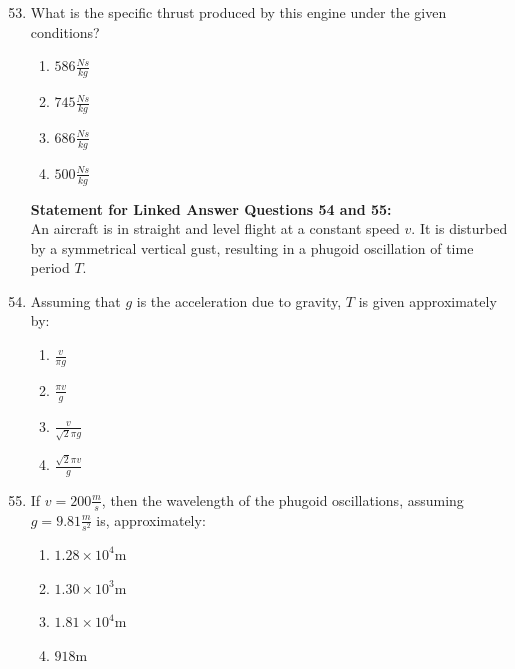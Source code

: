 \documentclass[journal]{IEEEtran}
\begin{document}
\begin{enumerate}
\setcounter{enumi}{52}
 
    \item What is the specific thrust produced by this engine under the given conditions?

        \begin{multicols}{4}
            \begin{enumerate}
                \item $586\frac{Ns}{kg}$
                \item $745\frac{Ns}{kg}$
                \item $686\frac{Ns}{kg}$
                \item $500\frac{Ns}{kg}$
            \end{enumerate}
        \end{multicols}

    \textbf{Statement for Linked Answer Questions 54 and 55:}\\
    An aircraft is in straight and level flight at a constant speed $v$. It is disturbed by a symmetrical vertical gust, resulting in a phugoid oscillation of time period $T$.\\

    \item Assuming that $g$ is the acceleration due to gravity, $T$ is given approximately by:

        \begin{multicols}{4}
            \begin{enumerate}
                \item $\frac{v}{\pi g}$
                \item $\frac{\pi v}{g}$
                \item $\frac{v}{\sqrt{2}\pi g}$
                \item $\frac{\sqrt{2}\pi v}{g}$
            \end{enumerate}
        \end{multicols}

    \item If $v=200\frac{m}{s}$, then the wavelength of the phugoid oscillations, assuming $g=9.81\frac{m}{s^2}$ is, approximately:

        \begin{multicols}{4}
            \begin{enumerate}
                \item $1.28\times10^4$m
                \item $1.30\times10^3$m
                \item $1.81\times10^4$m
                \item $918$m
            \end{enumerate}
        \end{multicols}



\end{enumerate}
\end{document}
